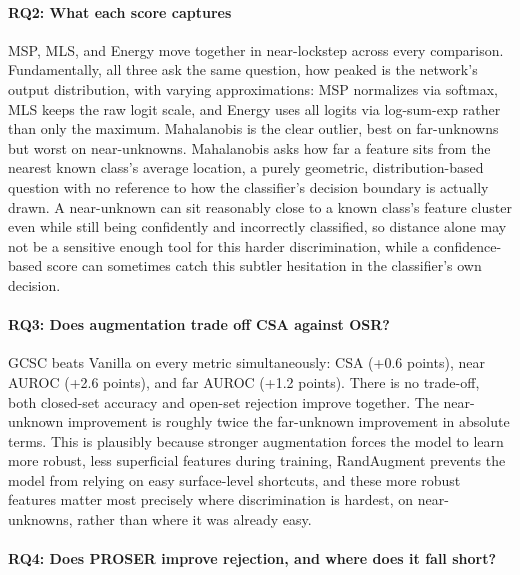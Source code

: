 \documentclass{article}
\begin{document}
\paragraph{RQ2: What each score captures}

MSP, MLS, and Energy move together in near-lockstep across every comparison. Fundamentally, all three ask the same question, how peaked is the network's output distribution, with varying approximations: MSP normalizes via softmax, MLS keeps the raw logit scale, and Energy uses all logits via log-sum-exp rather than only the maximum. Mahalanobis is the clear outlier, best on far-unknowns but worst on near-unknowns. Mahalanobis asks how far a feature sits from the nearest known class's average location, a purely geometric, distribution-based question with no reference to how the classifier's decision boundary is actually drawn. A near-unknown can sit reasonably close to a known class's feature cluster even while still being confidently and incorrectly classified, so distance alone may not be a sensitive enough tool for this harder discrimination, while a confidence-based score can sometimes catch this subtler hesitation in the classifier's own decision.

\paragraph{RQ3: Does augmentation trade off CSA against OSR?}

GCSC beats Vanilla on every metric simultaneously: CSA (+0.6 points), near AUROC (+2.6 points), and far AUROC (+1.2 points). There is no trade-off, both closed-set accuracy and open-set rejection improve together. The near-unknown improvement is roughly twice the far-unknown improvement in absolute terms. This is plausibly because stronger augmentation forces the model to learn more robust, less superficial features during training, RandAugment prevents the model from relying on easy surface-level shortcuts, and these more robust features matter most precisely where discrimination is hardest, on near-unknowns, rather than where it was already easy.

\paragraph{RQ4: Does PROSER improve rejection, and where does it fall short?}
\end{document}

